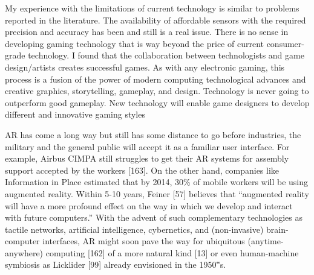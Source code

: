 My experience with the limitations of current technology is similar to problems reported in the literature. The availability of affordable sensors with the required precision and accuracy has been and still is a real issue. There is no sense in developing gaming technology that is way beyond the price of current consumer-grade technology. I found that the collaboration between technologists and game design/artists creates successful games. As with any electronic gaming, this process is a fusion of the power of modern computing technological advances and creative graphics, storytelling, gameplay, and design. Technology is never going to outperform good gameplay. New technology will enable game designers to develop different and innovative gaming styles





AR has come a long way but still has some distance to go
before industries, the military and the general public will
accept it as a familiar user interface. For example, Airbus
CIMPA still struggles to get their AR systems for assembly
support accepted by the workers [163]. On the other hand,
companies like Information in Place estimated that by 2014,
30\% of mobile workers will be using augmented reality.
Within 5-10 years, Feiner [57] believes that “augmented
reality will have a more profound effect on the way in which
we develop and interact with future computers.” With the
advent of such complementary technologies as tactile networks,
artificial intelligence, cybernetics, and (non-invasive)
brain-computer interfaces, AR might soon pave the way for
ubiquitous (anytime-anywhere) computing [162] of a more
natural kind [13] or even human-machine symbiosis as
Licklider [99] already envisioned in the 1950‟s.




